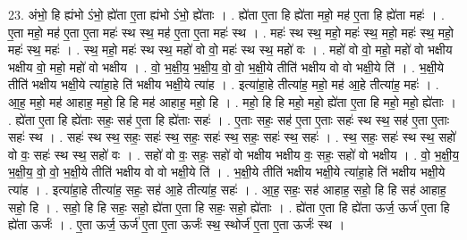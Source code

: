 \documentclass[17pt]{extarticle}
\begin{document}
23. अंभो॒ हि ह्यंभो ऽंभो॒ ह्ये॑ता ए॒ता ह्यंभो ऽंभो॒ ह्ये॑ताः । . ह्ये॑ता ए॒ता हि ह्ये॑ता महो॒ मह॑ ए॒ता हि ह्ये॑ता महः॑ । . ए॒ता महो॒ मह॑ ए॒ता ए॒ता महः॑ स्थ स्थ॒ मह॑ ए॒ता ए॒ता महः॑ स्थ । . महः॑ स्थ स्थ॒ महो॒ महः॑ स्थ॒ महो॒ महः॑ स्थ॒ महो॒ महः॑ स्थ॒ महः॑ । . स्थ॒ महो॒ महः॑ स्थ स्थ॒ महो॑ वो वो॒ महः॑ स्थ स्थ॒ महो॑ वः । . महो॑ वो वो॒ महो॒ महो॑ वो भक्षीय भक्षीय वो॒ महो॒ महो॑ वो भक्षीय । . वो॒ भ॒क्षी॒य॒ भ॒क्षी॒य॒ वो॒ वो॒ भ॒क्षी॒ये तीति॑ भक्षीय वो वो भक्षी॒ये ति॑ । . भ॒क्षी॒ये तीति॑ भक्षीय भक्षी॒ये त्या॑हा॒हे ति॑ भक्षीय भक्षी॒ये त्या॑ह । . इत्या॑हा॒हे तीत्या॑ह॒ महो॒ मह॑ आ॒हे तीत्या॑ह॒ महः॑ । . आ॒ह॒ महो॒ मह॑ आहाह॒ महो॒ हि हि मह॑ आहाह॒ महो॒ हि । . महो॒ हि हि महो॒ महो॒ ह्ये॑ता ए॒ता हि महो॒ महो॒ ह्ये॑ताः । . ह्ये॑ता ए॒ता हि ह्ये॑ताः सहः॒ सह॑ ए॒ता हि ह्ये॑ताः सहः॑ । . ए॒ताः सहः॒ सह॑ ए॒ता ए॒ताः सहः॑ स्थ स्थ॒ सह॑ ए॒ता ए॒ताः सहः॑ स्थ । . सहः॑ स्थ स्थ॒ सहः॒ सहः॑ स्थ॒ सहः॒ सहः॑ स्थ॒ सहः॒ सहः॑ स्थ॒ सहः॑ । . स्थ॒ सहः॒ सहः॑ स्थ स्थ॒ सहो॑ वो वः॒ सहः॑ स्थ स्थ॒ सहो॑ वः । . सहो॑ वो वः॒ सहः॒ सहो॑ वो भक्षीय भक्षीय वः॒ सहः॒ सहो॑ वो भक्षीय । . वो॒ भ॒क्षी॒य॒ भ॒क्षी॒य॒ वो॒ वो॒ भ॒क्षी॒ये तीति॑ भक्षीय वो वो भक्षी॒ये ति॑ । . भ॒क्षी॒ये तीति॑ भक्षीय भक्षी॒ये त्या॑हा॒हे ति॑ भक्षीय भक्षी॒ये त्या॑ह । . इत्या॑हा॒हे तीत्या॑ह॒ सहः॒ सह॑ आ॒हे तीत्या॑ह॒ सहः॑ । . आ॒ह॒ सहः॒ सह॑ आहाह॒ सहो॒ हि हि सह॑ आहाह॒ सहो॒ हि । . सहो॒ हि हि सहः॒ सहो॒ ह्ये॑ता ए॒ता हि सहः॒ सहो॒ ह्ये॑ताः । . ह्ये॑ता ए॒ता हि ह्ये॑ता ऊर्ज॒ ऊर्ज॑ ए॒ता हि ह्ये॑ता ऊर्जः॑ । . ए॒ता ऊर्ज॒ ऊर्ज॑ ए॒ता ए॒ता ऊर्जः॑ स्थ॒ स्थोर्ज॑ ए॒ता ए॒ता ऊर्जः॑ स्थ । \newline
\end{document}
